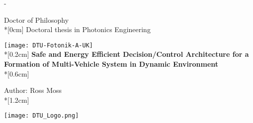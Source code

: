 \thispagestyle{empty}             %
\calccentering{\unitlength}
\begin{adjustwidth*}{\unitlength}{-\unitlength}
    \begin{adjustwidth}{-0.5cm}{-0.5cm}
        \sffamily
        \begin{flushright}
            Doctor of Philosophy\\*[0cm]
            Doctoral thesis in Photonics Engineering\\
        \end{flushright}
        \vspace*{\fill}
        \noindent
        \texttt{[image: DTU-Fotonik-A-UK]}\\*[0.2cm]
        \HUGE \textbf{Safe and Energy Efficient Decision/Control Architecture for a Formation of Multi-Vehicle 
        System in Dynamic Environment}\\*[0.6cm]
        \parbox[b]{0.5\linewidth}{
        \huge Author: Ross Moss\\*[1.2cm]
        } 
        
        \hfill\texttt{[image: DTU\_Logo.png]}
    \end{adjustwidth}
\end{adjustwidth*}
\normalfont
\normalsize
